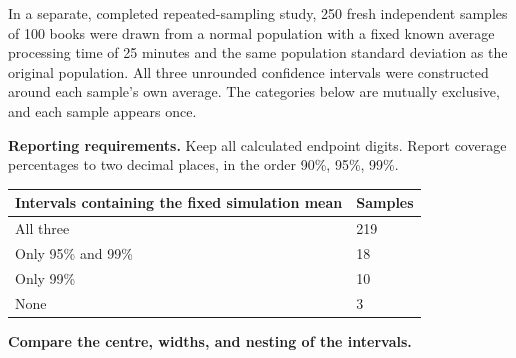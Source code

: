 In a separate, completed repeated-sampling study, 250 fresh independent samples of 100 books were drawn from a normal population with a fixed known average processing time of 25 minutes and the same population standard deviation as the original population. All three unrounded confidence intervals were constructed around each sample's own average. The categories below are mutually exclusive, and each sample appears once.

\textbf{Reporting requirements.} Keep all calculated endpoint digits. Report coverage percentages to two decimal places, in the order 90\%, 95\%, 99\%.

\begin{center}\begin{tabular}{@{}ll@{}}\toprule
Intervals containing the fixed simulation mean & Samples\\\midrule
All three & 219\\
Only 95\% and 99\% & 18\\
Only 99\% & 10\\
None & 3\\
\bottomrule\end{tabular}\end{center}


\BlankInformationTable
\clearpage
{}

\clearpage
{}
\textbf{Compare the centre, widths, and nesting of the intervals.}
\workspace{.65in}

